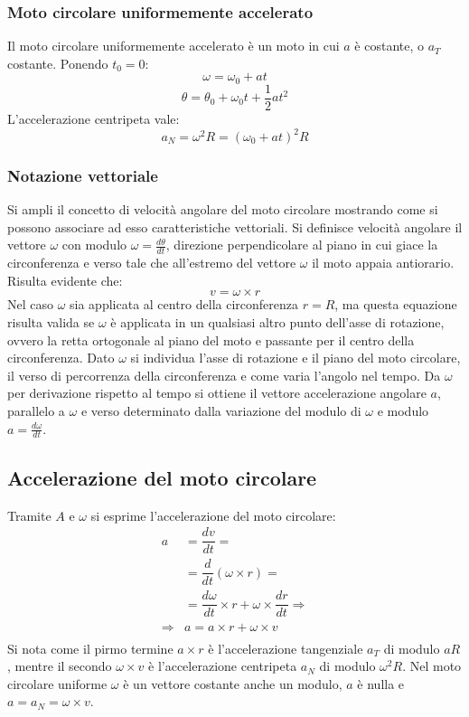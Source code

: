\documentclass[class=book, crop=false, oneside, 12pt]{standalone}
\begin{document}
		\subsubsection{Moto circolare uniformemente accelerato}
		Il moto circolare uniformemente accelerato \`e un moto in cui $a$ \`e costante, o $a_T$ costante.
		Ponendo $t_0=0$:
		$$\omega=\omega_0+at$$
		$$\theta=\theta_0+\omega_0t+\dfrac{1}{2}at^2$$
		L'accelerazione centripeta vale:
		$$a_N=\omega^2R=(\omega_0+at)^2R$$
		\subsubsection{Notazione vettoriale}
		Si ampli il concetto di velocit\`a angolare del moto circolare mostrando come si possono associare ad esso caratteristiche vettoriali.
		Si definisce velocit\`a angolare il vettore $\omega$ con modulo $\omega=\frac{d\theta}{dt}$, direzione perpendicolare al piano in cui giace la circonferenza e verso tale che all'estremo del vettore $\omega$ il moto appaia antiorario.
		Risulta evidente che:
		$$v=\omega\times r$$
		Nel caso $\omega$ sia applicata al centro della circonferenza $r=R$, ma questa equazione risulta valida se $\omega$ \`e applicata in un qualsiasi altro punto dell'asse di rotazione, ovvero la retta ortogonale al piano del moto e passante per il centro della circonferenza.
		Dato $\omega$ si individua l'asse di rotazione e il piano del moto circolare, il verso di percorrenza della circonferenza e come varia l'angolo nel tempo.
		Da $\omega$ per derivazione rispetto al tempo si ottiene il vettore accelerazione angolare $a$, parallelo a $\omega$ e verso determinato dalla variazione del modulo di $\omega$ e modulo $a=\frac{d\omega}{dt}$.
	\subsection{Accelerazione del moto circolare}
		Tramite $A$ e $\omega$ si esprime l'accelerazione del moto circolare:
		\begin{align*}
			a&=\dfrac{dv}{dt}=\\
			 &=\dfrac{d}{dt}(\omega\times r)=\\
			 &=\dfrac{d\omega}{dt}\times r + \omega\times\dfrac{dr}{dt}\Rightarrow\\
			\Rightarrow&a=a\times r+\omega\times v\\
		\end{align*}
		Si nota come il pirmo termine $a\times r$ \`e l'accelerazione tangenziale $a_T$ di modulo $aR$, mentre il secondo $\omega\times v$ \`e l'accelerazione centripeta $a_N$ di modulo $\omega^2R$.
		Nel moto circolare uniforme $\omega$ \`e un vettore costante anche un modulo, $a$ \`e nulla e $a=a_N=\omega\times v$.
\end{document}
